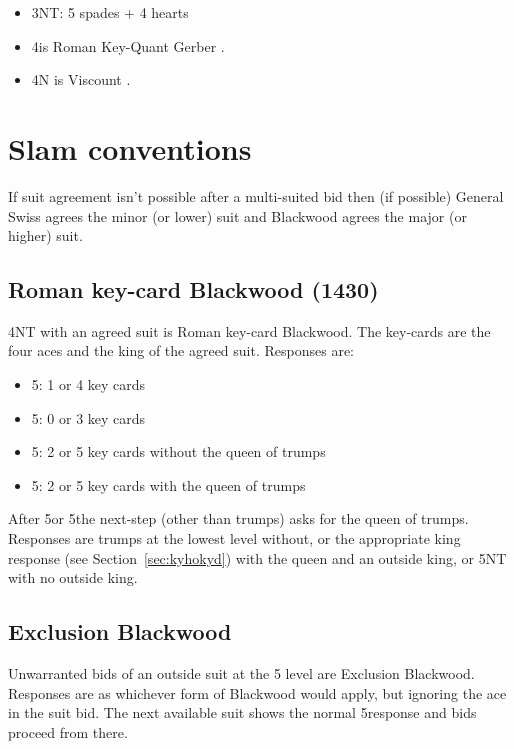 \documentclass[a4paper,14pt]{extarticle}
\begin{document}
\begin{itemize}
\item 3NT: 5 spades + 4 hearts

\item 4\clubs is Roman Key-Quant Gerber .
\item 4N is Viscount .
\end{itemize}

\newpage


\section{Slam conventions}
\label{sec:slam}

If suit agreement isn't possible after a multi-suited bid then (if possible)
General Swiss agrees the minor (or lower) suit and Blackwood agrees the major
(or higher) suit.

\subsection{Roman key-card Blackwood (1430)}
\label{sec:rkcb}

4NT with an agreed suit is Roman key-card Blackwood. The key-cards are the four aces
and the king of the agreed suit. Responses are:

\begin{itemize}
\item 5\clubs: 1 or 4 key cards
\item 5\diamonds: 0 or 3 key cards
\item 5\hearts: 2 or 5 key cards without the queen of trumps
\item 5\spades: 2 or 5 key cards with the queen of trumps
\end{itemize}

After 5\clubs or 5\diamonds the next-step (other than trumps) asks for the
queen of trumps. Responses are trumps at the lowest level without, or the
appropriate king response (see Section~\ref{sec:kyhokyd}) with the queen and an
outside king, or 5NT with no outside king.

\newpage

\subsection{Exclusion Blackwood}
\label{sec:exclusion}

Unwarranted bids of an outside suit at the 5 level are Exclusion Blackwood.
Responses are as whichever form of Blackwood would apply, but ignoring the ace
in the suit bid. The next available suit shows the normal 5\clubs response and
bids proceed from there.
\end{document}

